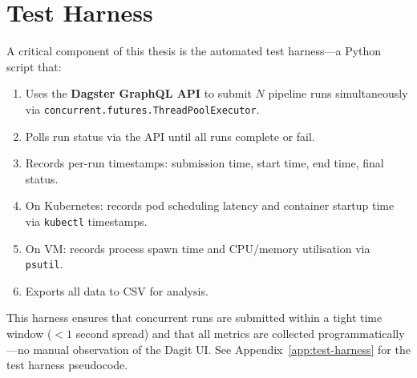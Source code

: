
\section{Test Harness}
\label{sec:test-harness}

A critical component of this thesis is the automated test harness---a Python script that:

\begin{enumerate}
  \item Uses the \textbf{Dagster GraphQL API} to submit $N$ pipeline runs simultaneously via \texttt{concurrent.futures.ThreadPoolExecutor}.
  \item Polls run status via the API until all runs complete or fail.
  \item Records per-run timestamps: submission time, start time, end time, final status.
  \item On Kubernetes: records pod scheduling latency and container startup time via \texttt{kubectl} timestamps.
  \item On VM: records process spawn time and CPU/memory utilisation via \texttt{psutil}.
  \item Exports all data to CSV for analysis.
\end{enumerate}

This harness ensures that concurrent runs are submitted within a tight time window ($< 1$ second spread) and that all metrics are collected programmatically---no manual observation of the Dagit UI. See Appendix~\ref{app:test-harness} for the test harness pseudocode.
